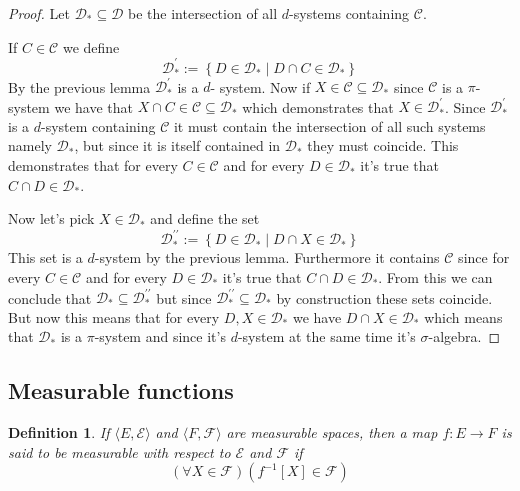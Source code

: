 \documentclass[a4paper]{amsart}
\newtheorem{deff}{Definition}
\newcommand{\pair}[2]{\langle #1, #2\rangle}
\begin{document}
\begin{proof}
    Let $\mathcal{D}_* \subseteq \mathcal{D}$ be the intersection of all $d$-systems containing  $\mathcal{C}$.
    
    If $C \in \mathcal{C}$ we define 
    $$ \mathcal{D}_*^\prime := \left\{ D \in \mathcal{D}_* \mid D \cap C \in \mathcal{D}_* \right\}$$
    By the previous lemma $\mathcal{D}_*^\prime$ is a $d$-
    system.
    Now if $X \in \mathcal{C}  \subseteq \mathcal{D}_* $ 
    since $\mathcal{C}$ is a $\pi$-system we have that 
    $X \cap C \in \mathcal{C} \subseteq \mathcal{D}_*$ 
    which demonstrates that $X \in  \mathcal{D}_*^\prime$. 
    Since $\mathcal{D}_*^\prime$ is a $d$-system containing 
    $\mathcal{C}$ it must contain the intersection of all such 
    systems namely $\mathcal{D}_*$, but since it is itself 
    contained in $\mathcal{D}_*$ they must coincide. This 
    demonstrates that for every $C \in \mathcal{C}$ and for 
    every $D \in \mathcal{D}_*$ it's true that $C \cap D \in \mathcal{D}_*$.
    
    Now let's pick $X \in \mathcal{D}_*$ and define the set
    $$
    \mathcal{D}_*^{\prime\prime} := \left\{ D \in \mathcal{D}_* \mid D \cap X \in \mathcal{D}_* \right\}
    $$
    This set is a $d$-system by the previous lemma.
    Furthermore it contains $\mathcal{C}$ since for every $C \in \mathcal{C}$ and for 
    every $D \in \mathcal{D}_*$ it's true that $C \cap D \in \mathcal{D}_*$. From this we can conclude that 
    $\mathcal{D}_* \subseteq \mathcal{D}_*^{\prime\prime}$ 
    but since $\mathcal{D}_*^{\prime\prime} \subseteq \mathcal{D}_*$ 
    by construction these sets coincide. But now this means 
    that for every $D, X \in \mathcal{D}_*$ we have $D \cap X \in \mathcal{D}_*$ which means that $\mathcal{D}_*$ is
    a $\pi$-system and since it's $d$-system at the same time
    it's $\sigma$-algebra.
\end{proof}




\subsection{Measurable functions}


\begin{deff}
    If $\pair{E}{\mathcal{E}}$ and $\pair{F}{\mathcal{F}}$ are 
    measurable spaces, then a map $f : E \longrightarrow F$ is 
    said to be measurable with respect to $\mathcal{E}$ and $\mathcal{F}$ if 
    $$
    \left(\forall X \in \mathcal{F}\right) \left( f^{-1}[X] \in \mathcal{F} \right)
    $$
\end{deff}
\end{document}

